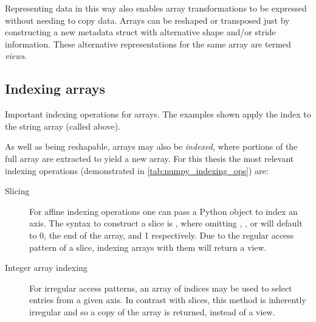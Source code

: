 \documentclass[thesis]{subfiles}
\begin{document}
Representing data in this way also enables array transformations to be expressed without needing to copy data.
Arrays can be reshaped or transposed just by constructing a new metadata struct with alternative shape and/or stride information.
These alternative representations for the same array are termed \emph{views}.

\subsection{Indexing arrays}
\label{sec:numpy_indexing_arrays}

\begin{table}
  \caption{
    Important indexing operations for \numpy{} arrays.
    The examples shown apply the index to the string array \pycode{["A", "B", "C", "D", "E", "F"]} (called  above).
  }
  \label{tab:numpy_indexing_ops}
\end{table}

As well as being reshapable, arrays may also be \emph{indexed}, where portions of the full array are extracted to yield a new array.
For this thesis the most relevant indexing operations (demonstrated in \cref{tab:numpy_indexing_ops}) are:
\begin{description}
  \item[Slicing]
    For affine indexing operations one can pass a Python  object to index an axis.
    The syntax to construct a slice is , where omitting , , or  will default to 0, the end of the array, and 1 respectively.
    Due to the regular access pattern of a slice, indexing \numpy{} arrays with them will return a view.
  \item[Integer array indexing]
    For irregular access patterns, an array of indices may be used to select entries from a given axis.
    In contrast with slices, this method is inherently irregular and so a copy of the array is returned, instead of a view.
\end{description}
\end{document}
